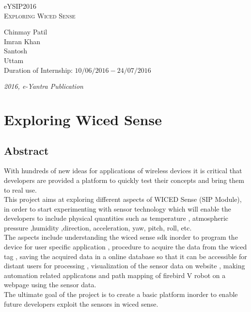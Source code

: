 \documentclass[a4paper,12pt,oneside]{book}
\begin{document}
\begin{titlepage}
\raggedright
{\Large eYSIP2016\\[1cm]}
{\Huge\scshape Exploring Wiced Sense \\[.1in]}
\vfill
\begin{flushright}
{\large Chinmay Patil \\}
{\large Imran Khan \\}
{\large Santosh \\}
{\large Uttam \\}
{\large Duration of Internship: $ 10/06/2016-24/07/2016 $ \\}
\end{flushright}

{\itshape 2016, e-Yantra Publication}
\end{titlepage}

\chapter[Exploring Wiced Sense]{Exploring Wiced Sense}

\section{Abstract}

\hspace{5mm} With hundreds of new ideas for applications of wireless devices it is critical that developers are provided a platform to quickly test their
concepts and bring them to real use. 
\\ \hspace{5mm} This project aims at exploring different aspects of WICED Sense (SIP Module), in order to start
experimenting with sensor technology which will enable the developers to include physical quantities such as temperature , atmospheric pressure ,humidity ,direction, acceleration, yaw, pitch, roll, etc.
\\ \hspace{5mm}
The aspects include understanding the wiced sense sdk inorder to program the device for user specific application , procedure to acquire the data from the wiced tag , saving the acquired data in a online database so that it can be accessible for distant users for processing , visualization of the sensor data on website , making automation related applicatons and path mapping of firebird V robot on a webpage using the sensor data.
\\ \hspace{5mm}
The ultimate goal of the project is to create a basic platform inorder to enable future developers exploit the sensors in wiced sense.
\end{document}
